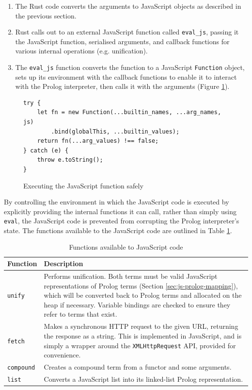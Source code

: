 \begin{enumerate}
\item The Rust code converts the arguments to JavaScript objects as described in the previous section.
\item Rust calls out to an external JavaScript function called \texttt{eval\_js}, passing it the JavaScript function, serialised arguments, and callback functions for various internal operations (e.g. unification).
\item The \texttt{eval\_js} function converts the function to a JavaScript \texttt{Function} object, sets up its environment with the callback functions to enable it to interact with the Prolog interpreter, then calls it with the arguments (Figure \ref{fig:js-execution}).
\end{enumerate}

\begin{figure}[H]
\centering
\begin{verbatim}
try {
    let fn = new Function(...builtin_names, ...arg_names, js)
        .bind(globalThis, ...builtin_values);
    return fn(...arg_values) !== false;
} catch (e) {
    throw e.toString();
}
\end{verbatim}
\caption{Executing the JavaScript function safely}
\label{fig:js-execution}
\end{figure}

By controlling the environment in which the JavaScript code is executed by explicitly providing the internal functions it can call, rather than simply using \texttt{eval}, the JavaScript code is prevented from corrupting the Prolog interpreter's state. The functions available to the JavaScript code are outlined in Table \ref{tab:js-ffi}.

\begin{table}[H]
\centering
\begin{tabular}{lp{12cm}}
\hline
\textbf{Function} & \textbf{Description} \\
\hline
\texttt{unify} & Performs unification. Both terms must be valid JavaScript representations of Prolog terms (Section \ref{sec:js-prolog-mapping}), which will be converted back to Prolog terms and allocated on the heap if necessary. Variable bindings are checked to ensure they refer to terms that exist. \\
\texttt{fetch} & Makes a synchronous HTTP request to the given URL, returning the response as a string. This is implemented in JavaScript, and is simply a wrapper around the \texttt{XMLHttpRequest} API, provided for convenience. \\
\texttt{compound} & Creates a compound term from a functor and some arguments. \\
\texttt{list} & Converts a JavaScript list into its linked-list Prolog representation. \\
\hline
\end{tabular}
\caption{Functions available to JavaScript code}
\label{tab:js-ffi}
\end{table}

